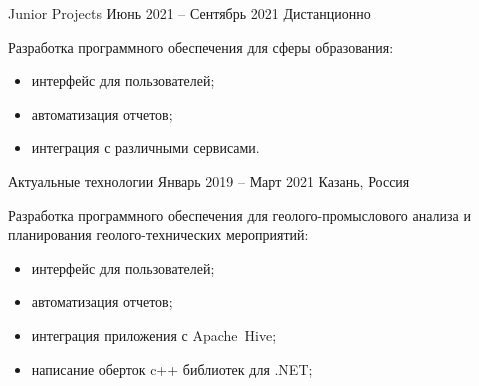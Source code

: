 \documentclass[10pt,a4paper,ragged2e,withhyper]{altacv}
\begin{document}

\makecvheader



\begin{paracol}{2}



{Junior Projects}
{Июнь 2021 -- Сентябрь 2021}
{Дистанционно}

Разработка программного обеспечения для сферы образования:

\begin{itemize}

  \item интерфейс для пользователей;
  \smallskip

  \item автоматизация отчетов;
  \smallskip

  \item интеграция с различными сервисами.

\end{itemize}

\divider

{Актуальные технологии}
{Январь 2019 -- Март 2021}
{Казань, Россия}

Разработка программного обеспечения для геолого-промыслового анализа и планирования геолого-технических мероприятий:

\begin{itemize}

  \item интерфейс для пользователей;
  \smallskip

  \item автоматизация отчетов;
  \smallskip

  \item интеграция приложения с Apache~Hive;
  \smallskip

  \item написание оберток c++ библиотек для .NET;
  \smallskip


\end{itemize}
\end{paracol}
\end{document}
